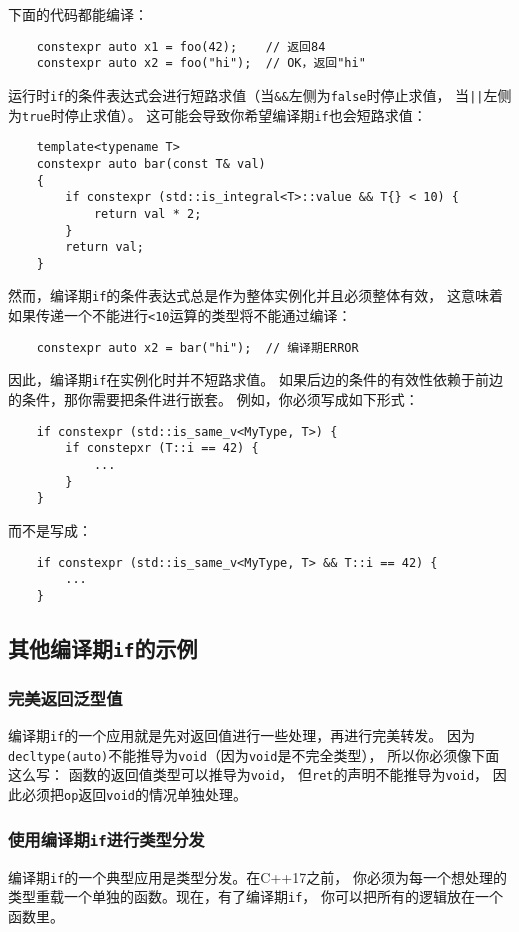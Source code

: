 下面的代码都能编译：
\begin{lstlisting}
    constexpr auto x1 = foo(42);    // 返回84
    constexpr auto x2 = foo("hi");  // OK，返回"hi"
\end{lstlisting}
运行时\texttt{if}的条件表达式会进行短路求值（当\texttt{\&\&}左侧为\texttt{false}时停止求值，
当\texttt{||}左侧为\texttt{true}时停止求值）。
这可能会导致你希望编译期\texttt{if}也会短路求值：
\begin{lstlisting}
    template<typename T>
    constexpr auto bar(const T& val)
    {
        if constexpr (std::is_integral<T>::value && T{} < 10) {
            return val * 2;
        }
        return val;
    }
\end{lstlisting}
然而，编译期\texttt{if}的条件表达式总是作为整体实例化并且必须整体有效，
这意味着如果传递一个不能进行\texttt{<10}运算的类型将不能通过编译：
\begin{lstlisting}
    constexpr auto x2 = bar("hi");  // 编译期ERROR
\end{lstlisting}
因此，编译期\texttt{if}在实例化时并不短路求值。
如果后边的条件的有效性依赖于前边的条件，那你需要把条件进行嵌套。
例如，你必须写成如下形式：
\begin{lstlisting}
    if constexpr (std::is_same_v<MyType, T>) {
        if constepxr (T::i == 42) {
            ...
        }
    }
\end{lstlisting}
而不是写成：
\begin{lstlisting}
    if constexpr (std::is_same_v<MyType, T> && T::i == 42) {
        ...
    }
\end{lstlisting}

\subsection{其他编译期\texttt{if}的示例}
\subsubsection{完美返回泛型值}
编译期\texttt{if}的一个应用就是先对返回值进行一些处理，再进行完美转发。
因为\texttt{decltype(auto)}不能推导为\texttt{void}（因为\texttt{void}是不完全类型），
所以你必须像下面这么写：
函数的返回值类型可以推导为\texttt{void}，
但\texttt{ret}的声明不能推导为\texttt{void}，
因此必须把\texttt{op}返回\texttt{void}的情况单独处理。

\subsubsection{使用编译期\texttt{if}进行类型分发}
编译期\texttt{if}的一个典型应用是类型分发。在C++17之前，
你必须为每一个想处理的类型重载一个单独的函数。现在，有了编译期\texttt{if}，
你可以把所有的逻辑放在一个函数里。

